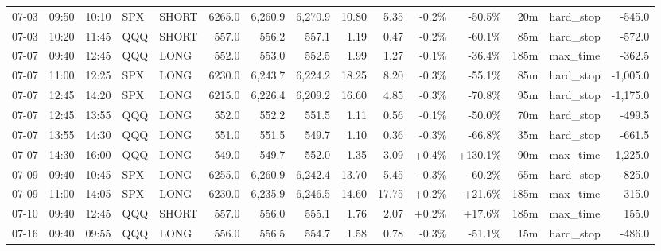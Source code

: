 \documentclass[11pt,a4paper,twoside]{article}
\begin{document}
\begin{landscape}
\begin{center}
\begin{longtable}{>{\color{txtmain}}l l l l l r r r r r r r r >{\color{txtmain}}l r}
07-03 & 09:50 & 10:10 & SPX & SHORT & 6265.0 & 6,260.9 & 6,270.9 & 10.80 & 5.35 & \textcolor{lossred}{-0.2\%} & \textcolor{lossred}{-50.5\%} & 20m & hard\_stop & \textcolor{lossred}{-545.0} \\
07-03 & 10:20 & 11:45 & QQQ & SHORT & 557.0 & 556.2 & 557.1 & 1.19 & 0.47 & \textcolor{lossred}{-0.2\%} & \textcolor{lossred}{-60.1\%} & 85m & hard\_stop & \textcolor{lossred}{-572.0} \\
07-07 & 09:40 & 12:45 & QQQ & LONG & 552.0 & 553.0 & 552.5 & 1.99 & 1.27 & \textcolor{lossred}{-0.1\%} & \textcolor{lossred}{-36.4\%} & 185m & max\_time & \textcolor{lossred}{-362.5} \\
07-07 & 11:00 & 12:25 & SPX & LONG & 6230.0 & 6,243.7 & 6,224.2 & 18.25 & 8.20 & \textcolor{lossred}{-0.3\%} & \textcolor{lossred}{-55.1\%} & 85m & hard\_stop & \textcolor{lossred}{-1,005.0} \\
07-07 & 12:45 & 14:20 & SPX & LONG & 6215.0 & 6,226.4 & 6,209.2 & 16.60 & 4.85 & \textcolor{lossred}{-0.3\%} & \textcolor{lossred}{-70.8\%} & 95m & hard\_stop & \textcolor{lossred}{-1,175.0} \\
07-07 & 12:45 & 13:55 & QQQ & LONG & 552.0 & 552.2 & 551.5 & 1.11 & 0.56 & \textcolor{lossred}{-0.1\%} & \textcolor{lossred}{-50.0\%} & 70m & hard\_stop & \textcolor{lossred}{-499.5} \\
07-07 & 13:55 & 14:30 & QQQ & LONG & 551.0 & 551.5 & 549.7 & 1.10 & 0.36 & \textcolor{lossred}{-0.3\%} & \textcolor{lossred}{-66.8\%} & 35m & hard\_stop & \textcolor{lossred}{-661.5} \\
07-07 & 14:30 & 16:00 & QQQ & LONG & 549.0 & 549.7 & 552.0 & 1.35 & 3.09 & \textcolor{wingreen}{+0.4\%} & \textcolor{wingreen}{+130.1\%} & 90m & max\_time & \textcolor{wingreen}{1,225.0} \\
07-09 & 09:40 & 10:45 & SPX & LONG & 6255.0 & 6,260.9 & 6,242.4 & 13.70 & 5.45 & \textcolor{lossred}{-0.3\%} & \textcolor{lossred}{-60.2\%} & 65m & hard\_stop & \textcolor{lossred}{-825.0} \\
07-09 & 11:00 & 14:05 & SPX & LONG & 6230.0 & 6,235.9 & 6,246.5 & 14.60 & 17.75 & \textcolor{wingreen}{+0.2\%} & \textcolor{wingreen}{+21.6\%} & 185m & max\_time & \textcolor{wingreen}{315.0} \\
07-10 & 09:40 & 12:45 & QQQ & SHORT & 557.0 & 556.0 & 555.1 & 1.76 & 2.07 & \textcolor{wingreen}{+0.2\%} & \textcolor{wingreen}{+17.6\%} & 185m & max\_time & \textcolor{wingreen}{155.0} \\
07-16 & 09:40 & 09:55 & QQQ & LONG & 556.0 & 556.5 & 554.7 & 1.58 & 0.78 & \textcolor{lossred}{-0.3\%} & \textcolor{lossred}{-51.1\%} & 15m & hard\_stop & \textcolor{lossred}{-486.0} \\

\end{longtable}
\end{center}
\end{landscape}
\end{document}
